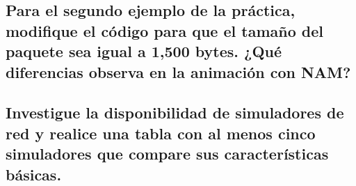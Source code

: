 \subsection*{Para el segundo ejemplo de la pr\'actica, modifique el c\'odigo para que el tamaño del paquete sea igual a 1,500 bytes.
¿Qu\'e diferencias observa en la animaci\'on con NAM?}

\subsection*{Investigue la disponibilidad de simuladores de red y realice una tabla con al menos cinco simuladores que compare sus
caracter\'isticas b\'asicas.}
